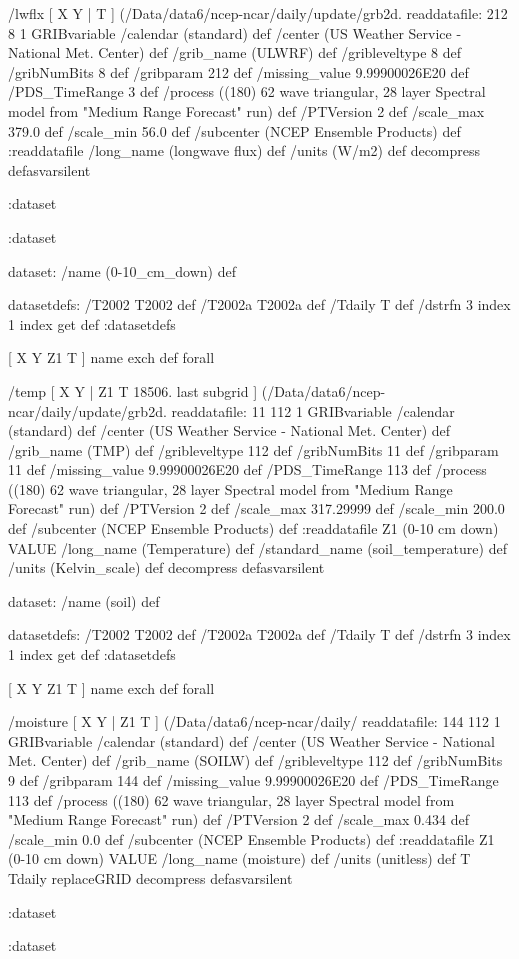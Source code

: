 \begin{ingrid}
   /lwflx { [ X Y | T ] (/Data/data6/ncep-ncar/daily/update/grb2d.%
   readdatafile:
   212 8 1 GRIBvariable
   /calendar (standard) def
   /center (US Weather Service - National Met. Center) def
   /grib_name (ULWRF) def
   /gribleveltype 8 def
   /gribNumBits 8 def
   /gribparam 212 def
   /missing_value 9.99900026E20 def
   /PDS_TimeRange 3 def
   /process ((180) 62 wave triangular, 28 layer Spectral model from "Medium Range Forecast" run) def
   /PTVersion 2 def
   /scale_max 379.0 def
   /scale_min 56.0 def
   /subcenter (NCEP Ensemble Products) def
   :readdatafile
   /long_name (longwave flux) def
   /units (W/m2) def
   decompress
   } defasvarsilent

  :dataset

 :dataset %

 dataset: /name (0-10_cm_down) def

  datasetdefs:
  /T2002 T2002 def
  /T2002a T2002a def
  /Tdaily T def
  /dstrfn 3 index 1 index get def
  :datasetdefs

  [ X Y Z1 T ] { name exch def } forall

   /temp { [ X Y | Z1 T 18506. last subgrid ] (/Data/data6/ncep-ncar/daily/update/grb2d.%
   readdatafile:
   11 112 1 GRIBvariable
   /calendar (standard) def
   /center (US Weather Service - National Met. Center) def
   /grib_name (TMP) def
   /gribleveltype 112 def
   /gribNumBits 11 def
   /gribparam 11 def
   /missing_value 9.99900026E20 def
   /PDS_TimeRange 113 def
   /process ((180) 62 wave triangular, 28 layer Spectral model from "Medium Range Forecast" run) def
   /PTVersion 2 def
   /scale_max 317.29999 def
   /scale_min 200.0 def
   /subcenter (NCEP Ensemble Products) def
   :readdatafile
   Z1 (0-10 cm down) VALUE
   /long_name (Temperature) def
   /standard_name (soil_temperature) def
   /units (Kelvin_scale) def
   decompress
   } defasvarsilent

  dataset: /name (soil) def

   datasetdefs:
   /T2002 T2002 def
   /T2002a T2002a def
   /Tdaily T def
   /dstrfn 3 index 1 index get def
   :datasetdefs

   [ X Y Z1 T ] { name exch def } forall

   /moisture { [ X Y | Z1 T ] (/Data/data6/ncep-ncar/daily/%
   readdatafile:
   144 112 1 GRIBvariable
   /calendar (standard) def
   /center (US Weather Service - National Met. Center) def
   /grib_name (SOILW) def
   /gribleveltype 112 def
   /gribNumBits 9 def
   /gribparam 144 def
   /missing_value 9.99900026E20 def 
   /PDS_TimeRange 113 def
   /process ((180) 62 wave triangular, 28 layer Spectral model from "Medium Range Forecast" run) def
   /PTVersion 2 def
   /scale_max 0.434 def
   /scale_min 0.0 def
   /subcenter (NCEP Ensemble Products) def
   :readdatafile
   Z1 (0-10 cm down) VALUE
   /long_name (moisture) def
   /units (unitless) def
   T Tdaily replaceGRID 
   decompress
   } defasvarsilent

  :dataset

 :dataset

\end{ingrid}

